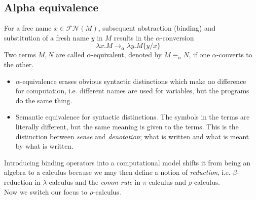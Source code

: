\documentclass[12pt]{article}
\numberwithin{equation}{section}
\begin{document}
\subsection{Alpha equivalence}
For a free name $x \in \mathcal{FN}(M)$, subsequent abstraction (binding) and substitution of a fresh name $y$ in $M$ results in the $\alpha$-conversion
\[ \lambda x.M \rightarrow_{\alpha} \lambda y.M \{ y/x \} \]
Two terms $M, N$ are called $\alpha$-equivalent, denoted by $M \equiv_{\alpha} N$, if one $\alpha$-converts to the other.

\begin{itemize}
\item $\alpha$-equivalence erases obvious syntactic distinctions which make no difference for computation, i.e. different names are used for variables, but the programs do the same thing.

\item Semantic equivalence for syntactic distinctions. The symbols in the terms are literally different, but the same meaning is given to the terms. This is the distinction between \emph{sense} and \emph{denotation}; what is written and what is meant by what is written.
\end{itemize}

Introducing binding operators into a computational model shifts it from being an algebra to a calculus because we may then define a notion of \emph{reduction}, i.e. $\beta$-reduction in $\lambda$-calculus and the \emph{comm rule} in $\pi$-calculus and $\rho$-calculus. \\

Now we switch our focus to $\rho$-calculus.
\end{document}
